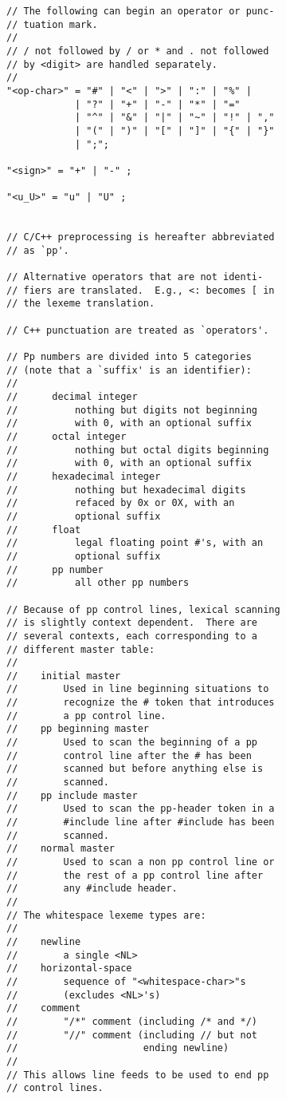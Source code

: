 \documentclass[12pt]{article}
\newenvironment{indpar}[1][0.3in]%
	{\begin{list}{}%
		     {\setlength{\itemsep}{0in}%
		      \setlength{\topsep}{0in}%
		      \setlength{\parsep}{1ex}%
		      \setlength{\labelwidth}{#1}%
		      \setlength{\leftmargin}{#1}%
		      \addtolength{\leftmargin}{\labelsep}}%
	 \item}%
	{\end{list}}
\begin{document}
\begin{indpar}
\begin{verbatim}
// The following can begin an operator or punc-
// tuation mark.
//
// / not followed by / or * and . not followed
// by <digit> are handled separately.
//
"<op-char>" = "#" | "<" | ">" | ":" | "%" |
            | "?" | "+" | "-" | "*" | "="
            | "^" | "&" | "|" | "~" | "!" | ","
            | "(" | ")" | "[" | "]" | "{" | "}"
            | ";";

"<sign>" = "+" | "-" ;

"<u_U>" = "u" | "U" ;


// C/C++ preprocessing is hereafter abbreviated
// as `pp'.

// Alternative operators that are not identi-
// fiers are translated.  E.g., <: becomes [ in
// the lexeme translation.

// C++ punctuation are treated as `operators'.

// Pp numbers are divided into 5 categories
// (note that a `suffix' is an identifier):
//
//      decimal integer
//          nothing but digits not beginning
//          with 0, with an optional suffix
//      octal integer
//          nothing but octal digits beginning
//          with 0, with an optional suffix
//      hexadecimal integer
//          nothing but hexadecimal digits
//          refaced by 0x or 0X, with an
//          optional suffix
//      float
//          legal floating point #'s, with an
//          optional suffix
//      pp number
//          all other pp numbers

// Because of pp control lines, lexical scanning
// is slightly context dependent.  There are
// several contexts, each corresponding to a
// different master table:
//
//    initial master
//        Used in line beginning situations to
//        recognize the # token that introduces
//        a pp control line.
//    pp beginning master
//        Used to scan the beginning of a pp
//        control line after the # has been
//        scanned but before anything else is
//        scanned.
//    pp include master
//        Used to scan the pp-header token in a
//        #include line after #include has been
//        scanned.
//    normal master
//        Used to scan a non pp control line or
//        the rest of a pp control line after
//        any #include header.
//
// The whitespace lexeme types are:
//
//    newline
//        a single <NL>
//    horizontal-space
//        sequence of "<whitespace-char>"s
//        (excludes <NL>'s)
//    comment
//        "/*" comment (including /* and */)
//        "//" comment (including // but not
//                      ending newline)
//
// This allows line feeds to be used to end pp
// control lines.



\end{verbatim}
\end{indpar}
\end{document}
